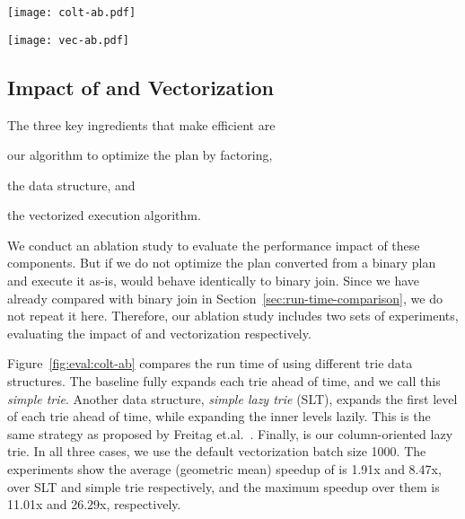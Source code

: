 \begin{figure*}
  \centering
  \begin{minipage}{.45\textwidth}
    \centering
    \texttt{[image: colt-ab.pdf]}
    \label{fig:eval:colt-ab}
  \end{minipage}%
  \hspace{1em}
  \begin{minipage}{.45\textwidth}
    \centering
    \texttt{[image: vec-ab.pdf]}
    \label{fig:eval:vec-ab}
  \end{minipage}
\end{figure*}
\subsection{Impact of \COLT and Vectorization}
The three key ingredients that make \FJ efficient
are \begin{enumerate*}
  \item our algorithm to optimize the \FJ plan by factoring,
  \item the \COLT data structure, and
  \item the vectorized execution algorithm.
\end{enumerate*}
We conduct an ablation study to evaluate the performance impact of these components.
But if we do not optimize the \FJ plan converted from a binary plan
and execute it as-is, \FJ would behave identically to binary join.
Since we have already compared \FJ with binary join in Section~\ref{sec:run-time-comparison},
we do not repeat it here.
Therefore, our ablation study includes two sets of experiments,
evaluating the impact of \COLT and vectorization respectively.



Figure~\ref{fig:eval:colt-ab} compares the run time of \FJ using different trie data structures.
The baseline fully expands each trie ahead of time, and we call this \emph{simple trie}.
Another data structure, \emph{simple lazy trie} (SLT), expands the first level of each trie
ahead of time, while expanding the inner levels lazily.
This is the same strategy as proposed by Freitag et.al.~\cite{DBLP:journals/pvldb/FreitagBSKN20}.
Finally, \COLT is our column-oriented lazy trie.
In all three cases, we use the default vectorization batch size 1000.
The experiments show the average (geometric mean) speedup of \COLT
is 1.91x and 8.47x, over SLT and simple trie respectively,
and the maximum speedup over them is 11.01x and 26.29x, respectively.


